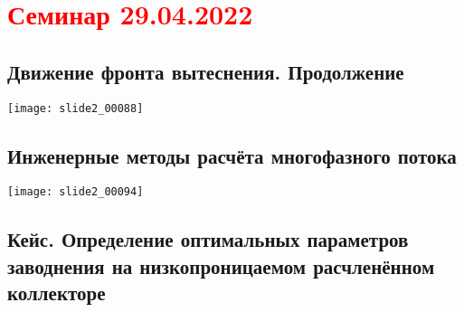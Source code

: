 \documentclass[main.tex]{subfiles}
\begin{document}
\section{\textcolor{red}{Семинар 29.04.2022}}

\subsection{Движение фронта вытеснения. Продолжение}

\texttt{[image: slide2\_00088]}






\subsection{Инженерные методы расчёта многофазного потока}

\texttt{[image: slide2\_00094]}











\subsection{Кейс. Определение оптимальных параметров заводнения на низкопроницаемом расчленённом коллекторе}
\end{document}
